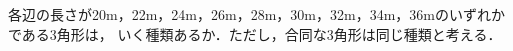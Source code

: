 \documentclass[../../main.tex]{subfiles}
\begin{document}
各辺の長さが20m，22m，24m，26m，28m，30m，32m，34m，36mのいずれかである3角形は，
いく種類あるか．ただし，合同な3角形は同じ種類と考える．
\end{document}
